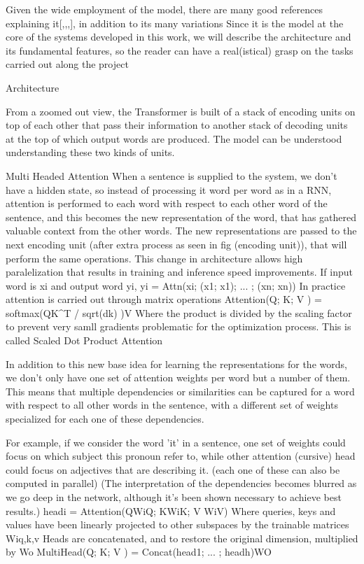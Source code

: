 \documentclass[11pt,english,listoffigures,listoftables]{tfgetsinf}
\begin{document}
Given the wide employment of the model, there are many good references explaining it[,,,], in addition to its many variations
Since it is the model at the core of the systems developed in this work, we will describe the architecture and its fundamental features, so the reader can have a real(istical) grasp on the tasks carried out along the project

Architecture

From a zoomed out view, the Transformer is built of a stack of encoding units on top of each other that pass their information to another stack of decoding units at the top of which output words are produced.
The model can be understood understanding these two kinds of units.

Multi Headed Attention 
When a sentence is supplied to the system, we don't have a hidden state, so instead of processing it word per word as in a RNN, attention is performed to each word with respect to each other word of the sentence, and this becomes the new representation of the word, that has gathered valuable context from the other words. The new representations are passed to the next encoding unit (after extra process as seen in fig (encoding unit)), that will perform the same operations.
This change in architecture allows high paralelization that results in training and inference speed improvements.
If input word is xi and output word yi,
yi = Attn(xi; (x1; x1); ... ; (xn; xn))
In practice attention is carried out through matrix operations
Attention(Q; K; V ) = softmax(QK^T / sqrt(dk) )V
Where the product is divided by the scaling factor to prevent very samll gradients problematic for the optimization process.
This is called Scaled Dot Product Attention

In addition to this new base idea for learning the representations for the words, we don't only have one set of attention weights per word but a number of them. This means that multiple dependencies or similarities can be captured for a word with respect to all other words in the sentence, with a different set of weights specialized for each one of these dependencies.

For example, if we consider the word 'it' in a sentence, one set of weights could focus on which subject this pronoun refer to, while other attention (cursive) head could focus on adjectives that are describing it.
(each one of these can also be computed in parallel)
(The interpretation of the dependencies becomes blurred as we go deep in the network, although it's been shown necessary to achieve best results.)
headi = Attention(QWiQ; KWiK; V WiV)
Where queries, keys and values have been linearly projected to other subspaces by the trainable matrices Wi{q,k,v}
Heads are concatenated, and to restore the original dimension, multiplied by Wo 
MultiHead(Q; K; V ) = Concat(head1; ... ; headh)WO
\end{document}
